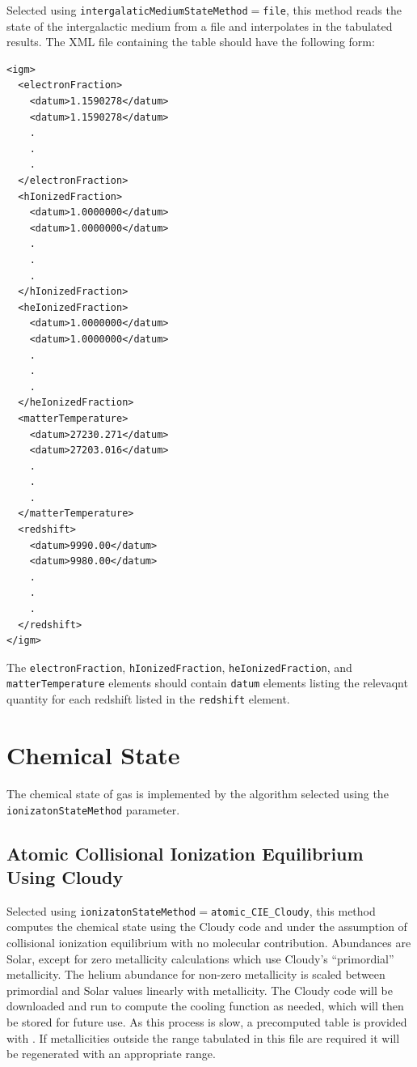 Selected using {\tt intergalaticMediumStateMethod}$=${\tt file}, this method reads the state of the intergalactic medium from a file and interpolates in the tabulated results. The XML file containing the table should have the following form:
 \begin{verbatim}
<igm>
  <electronFraction>
    <datum>1.1590278</datum>
    <datum>1.1590278</datum>
    .
    .
    .
  </electronFraction>
  <hIonizedFraction>
    <datum>1.0000000</datum>
    <datum>1.0000000</datum>
    .
    .
    .
  </hIonizedFraction>
  <heIonizedFraction>
    <datum>1.0000000</datum>
    <datum>1.0000000</datum>
    .
    .
    .
  </heIonizedFraction>
  <matterTemperature>
    <datum>27230.271</datum>
    <datum>27203.016</datum>
    .
    .
    .
  </matterTemperature>
  <redshift>
    <datum>9990.00</datum>
    <datum>9980.00</datum>
    .
    .
    .
  </redshift>
</igm>
 \end{verbatim}
 The {\tt electronFraction}, {\tt hIonizedFraction}, {\tt heIonizedFraction}, and {\tt matterTemperature} elements should contain {\tt datum} elements listing the relevaqnt quantity for each redshift listed in the {\tt redshift} element.

\section{Chemical State}\label{sec:ChemicalStateMethod}

The chemical state of gas is implemented by the algorithm selected using the {\tt ionizatonStateMethod} parameter.

\subsection{Atomic Collisional Ionization Equilibrium Using {\sc Cloudy}}

Selected using {\tt ionizatonStateMethod}$=${\tt atomic\_CIE\_Cloudy}, this method computes the chemical state using the {\sc Cloudy} code and under the assumption of collisional ionization equilibrium with no molecular contribution. Abundances are Solar, except for zero metallicity calculations which use {\sc Cloudy}'s ``primordial'' metallicity. The helium abundance for non-zero metallicity is scaled between primordial and Solar values linearly with metallicity. The {\sc Cloudy} code will be downloaded and run to compute the cooling function as needed, which will then be stored for future use. As this process is slow, a precomputed table is provided with \glc. If metallicities outside the range tabulated in this file are required it will be regenerated with an appropriate range.

